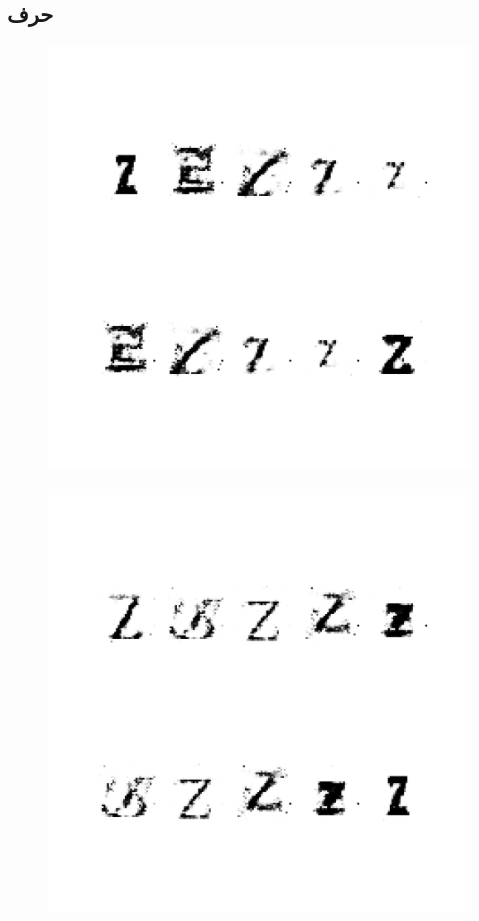 \documentclass{article}
\begin{document}
\subsection{حرف }
\begin{figure}[H]
	\centerline{\includegraphics[width=\textwidth , height=\textheight ]{../results/CGAN_Adam/figs/letters/Z/95.pdf}}
\end{figure}
\begin{figure}[H]
	\centerline{\includegraphics[width=\textwidth , height=\textheight ]{../results/CGAN_Adam/figs/letters/Z/90.pdf}}
\end{figure}
\end{document}
